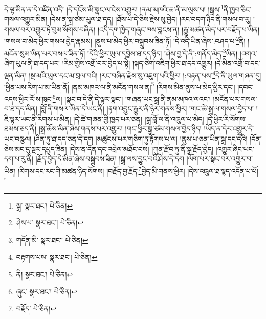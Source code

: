 དེ་ལྟ་མིན་ན་དེ་འཛིན་འདི། །དེ་དངོས་མི་སྣང་ལ་ངེས་འགྱུར། །ནམ་མཁའི་ཆ་ནི་མ་ལུས་པ། །སྒྲས་\footnote{སྒྲ་  སྣར་ཐང་།  པེ་ཅིན། }ནི་ཁྱབ་ཅིང་གསལ་འགྱུར་མིན། །དེས་ན་སྒྲ་ཙམ་ཡུལ་ཐ་དད། །ཐོས་པ་དེ་ཅིས་རྗེས་སུ་བྱེད། །རང་བདག་ཉིད་ནི་གསལ་བ་རུ། །གསལ་བར་འགྱུར་ཏེ་བུམ་སོགས་བཞིན། །འདི་དག་ཁྱེད་གཞུང་ཁས་བླངས་ན། །རྒྱུ་མཚན་མེད་པར་བརྗོད་པ་ཡིན། །གསལ་བ་མེད་ཕྱིར་གསལ་བྱེད་རྣམས། །ནུས་པ་མེད་ཕྱིར་བསྒྲུབས་ཟིན་ཏོ། །དེ་འདི་ཡིན་ཞེས་:བཤད་པ་\footnote{ཤེས་པ་  སྣར་ཐང་།  པེ་ཅིན། }ནི། །མངོན་སུམ་ཡིན་པར་བསལ་ཟིན་ཏོ། །དེའི་ཕྱིར་ཡུལ་དབྱེས་ཐ་དད་ཉིད། །ཤེས་བྱ་དེ་ནི་:གནོད་མེད་\footnote{གདོན་མི་  སྣར་ཐང་།  པེ་ཅིན། }ཡིན། །འགའ་ཞིག་ཡུལ་ནི་ཐ་དད་པར། །རིམ་གྱིས་འགྲོ་བར་བྱེད་པ་སྟེ། །སྐད་ཅིག་འཇིག་ཕྱིར་ཐ་དད་འགྱུར། །དེ་མིན་འགྲོ་བ་དང་ལྡན་མིན། །སྔ་མའི་ཡུལ་དང་མ་བྲལ་བའི། །རང་བཞིན་རྗེས་སུ་འཇུག་པའི་ཕྱིར། །:བརྟན་པས་\footnote{བརྟགས་པས་  སྣར་ཐང་།  པེ་ཅིན། }དེ་ནི་ཡུལ་གཞན་དུ། །ཕྱིན་པས་རིག་པ་མ་ཡིན་ནོ། །ནམ་མཁའ་ལ་ནི་མངོན་གསལ་ན།\footnote{ནི།  སྣར་ཐང་།  པེ་ཅིན། } །རིགས་མིན་ནུས་པ་མེད་ཕྱིར་དང་། །དབང་འདས་ཕྱིར་རོ་ས་ཁུང་\footnote{ཞུང་  སྣར་ཐང་།  པེ་ཅིན། }ལ། །སྣང་བ་དེ་ནི་དེ་ལྟར་སྣང་། །གཞན་ཡང་སྒྲ་ནི་ནམ་མཁའ་ལའང་། །མངོན་པར་གསལ་བ་ཐ་དད་མིན། །བློ་ནི་གསལ་ཡིན་དེ་ཡང་ནི། །རྟག་འབྱུང་རྒྱུར་ནི་ཉེར་གནས་ཕྱིར། །གང་ཚེ་སྒྲ་ལ་གསལ་བྱེད་པ། །ཇི་ལྟར་ཡང་ནི་རིགས་པ་མིན། །དེ་ཚེ་གཞན་གྱི་ཁྱད་པར་ཅན། །སྒྲ་བློ་ལ་ནི་འཁྲུལ་པ་མེད། །དེ་ཕྱིར་རི་སོགས་ཐམས་ཅད་ནི། །སྒྲ་ཆོས་མིན་ཞེས་གནས་པར་འགྱུར། །གང་ཕྱིར་སྒྲ་ཙམ་གསལ་བྱེད་ཉིད། །ཡོད་ན་དེར་འགྱུར་དེ་ཡང་བསྩལ། །ཤིན་ཏུ་ཐ་དད་ཅན་དེ་དག །མཚུངས་པར་གཅིག་ཏུ་རྟོགས་པ་ལ། །ནུས་པ་ཅན་ཡིན་སྒྲ་དང་དེའི། །དོན་ཅེས་མང་དུ་སྔར་དཔྱད་ཟིན། །དེས་ན་དོན་དང་འབྲེལ་མཐོང་བས། །ཀུན་རྫོབ་ཏུ་ནི་སྒྲ་རྗོད་བྱེད། །འགྱུར་ཞིང་ཡང་དག་པ་རུ་ནི། །རྗོད་བྱེད་དེ་མིན་ཞེས་བསྒྲུབས་ཟིན། །སྒྲ་ལས་བྱུང་བའི་ཤེས་དེ་དག །ལོག་པར་སྣང་བར་འགྱུར་བ་ཡིན། །རིགས་དང་རང་གི་མཚན་ཉིད་སོགས། །བརྗོད་བྱ་རྗོད་\footnote{བརྗོད་  པེ་ཅིན། }བྱེད་མི་གནས་ཕྱིར། །དེས་འཁྲུལ་ཐ་སྙད་འདོན་པ་པོ། །
